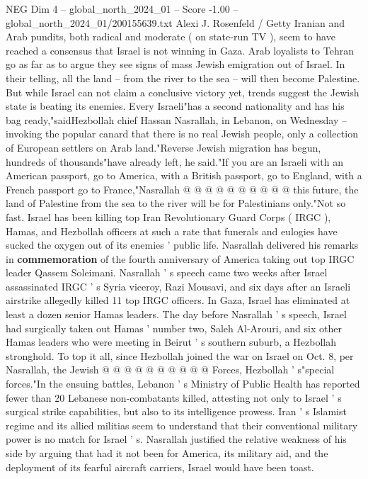 \begin{textsample}{NEG Dim 4 – global\_north\_2024\_01 – Score -1.00 – global\_north\_2024\_01/200155639.txt}  \label{ex:f4_neg_122}
Alexi J.
Rosenfeld / Getty Iranian and Arab pundits, both radical and moderate ( on state-run TV ), seem to have reached a consensus that Israel is not winning in Gaza.
Arab loyalists to Tehran go as far as to argue they see signs of mass Jewish emigration out of Israel.
In their telling, all the land -- from the river to the sea -- will then become Palestine.
But while Israel can not claim a conclusive victory yet, trends suggest the Jewish state is beating its enemies.
Every Israeli"has a second nationality and has his bag ready,"saidHezbollah chief Hassan Nasrallah, in Lebanon, on Wednesday -- invoking the popular canard that there is no real Jewish people, only a collection of European settlers on Arab land."Reverse Jewish migration has begun, hundreds of thousands"have already left, he said."If you are an Israeli with an American passport, go to America, with a British passport, go to England, with a French passport go to France,"Nasrallah @ @ @ @ @ @ @ @ @ @ this future, the land of Palestine from the sea to the river will be for Palestinians only."Not so fast.
Israel has been killing top Iran Revolutionary Guard Corps ( IRGC ), Hamas, and Hezbollah officers at such a rate that funerals and eulogies have sucked the oxygen out of its enemies ' public life.
Nasrallah delivered his remarks in \textbf{commemoration} of the fourth anniversary of America taking out top IRGC leader Qassem Soleimani.
Nasrallah ' s speech came two weeks after Israel assassinated IRGC ' s Syria viceroy, Razi Mousavi, and six days after an Israeli airstrike allegedly killed 11 top IRGC officers.
In Gaza, Israel has eliminated at least a dozen senior Hamas leaders.
The day before Nasrallah ' s speech, Israel had surgically taken out Hamas ' number two, Saleh Al-Arouri, and six other Hamas leaders who were meeting in Beirut ' s southern suburb, a Hezbollah stronghold.
To top it all, since Hezbollah joined the war on Israel on Oct. 8, per Nasrallah, the Jewish @ @ @ @ @ @ @ @ @ @ Forces, Hezbollah ' s"special forces."In the ensuing battles, Lebanon ' s Ministry of Public Health has reported fewer than 20 Lebanese non-combatants killed, attesting not only to Israel ' s surgical strike capabilities, but also to its intelligence prowess.
Iran ' s Islamist regime and its allied militias seem to understand that their conventional military power is no match for Israel ' s.
Nasrallah justified the relative weakness of his side by arguing that had it not been for America, its military aid, and the deployment of its fearful aircraft carriers, Israel would have been toast.

\end{textsample}
